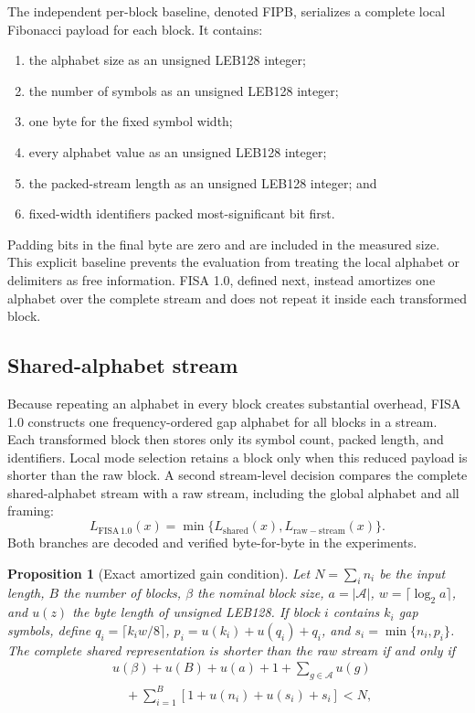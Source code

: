 \documentclass[a4paper,fleqn]{cas-dc}
\newtheorem{proposition}{Proposition}
\begin{document}
The independent per-block baseline, denoted FIPB, serializes a complete local
Fibonacci payload for each block. It contains:
\begin{enumerate}
\item the alphabet size as an unsigned LEB128 integer;
\item the number of symbols as an unsigned LEB128 integer;
\item one byte for the fixed symbol width;
\item every alphabet value as an unsigned LEB128 integer;
\item the packed-stream length as an unsigned LEB128 integer; and
\item fixed-width identifiers packed most-significant bit first.
\end{enumerate}
Padding bits in the final byte are zero and are included in the measured size.
This explicit baseline prevents the evaluation from treating the local
alphabet or delimiters as free information. FISA 1.0, defined next, instead
amortizes one alphabet over the complete stream and does not repeat it inside
each transformed block.

\subsection{Shared-alphabet stream}
\label{sec:shared-alphabet}

Because repeating an alphabet in every block creates substantial overhead,
FISA 1.0 constructs one frequency-ordered gap
alphabet for all blocks in a stream. Each transformed block then stores only its
symbol count, packed length, and identifiers. Local mode selection retains a
block only when this reduced payload is shorter than the raw block. A second
stream-level decision compares the complete shared-alphabet stream with a raw
stream, including the global alphabet and all framing:
\begin{equation}
L_{\mathrm{FISA\,1.0}}(x)=
\min\{L_{\mathrm{shared}}(x),L_{\mathrm{raw-stream}}(x)\}.
\label{eq:shared-selector}
\end{equation}
Both branches are decoded and verified byte-for-byte in the experiments.

\begin{proposition}[Exact amortized gain condition]
\label{prop:amortized-gain}
Let $N=\sum_i n_i$ be the input length, $B$ the number of blocks,
$\beta$ the nominal block size,
$a=|\mathcal{A}|$, $w=\lceil\log_2 a\rceil$, and $u(z)$ the byte length of unsigned
LEB128. If block $i$ contains $k_i$ gap symbols, define
$q_i=\lceil k_iw/8\rceil$, $p_i=u(k_i)+u(q_i)+q_i$, and
$s_i=\min\{n_i,p_i\}$. The complete shared representation is shorter than the
raw stream if and only if
\begin{equation}
\begin{aligned}
&u(\beta)+u(B)+u(a)+1+\sum_{g\in\mathcal{A}}u(g)\\
&\quad+\sum_{i=1}^{B}\left[1+u(n_i)+u(s_i)+s_i\right] < N,
\end{aligned}
\label{eq:exact-shared-condition}
\end{equation}
\end{proposition}
\end{document}
